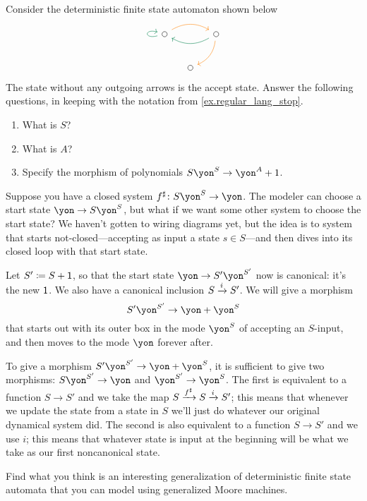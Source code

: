 \documentclass[DynamicalBook]{subfiles}
\begin{document}
\begin{exercise}
Consider the deterministic finite state automaton shown below
\[
\begin{tikzcd}[column sep=small]
	\LMO{}\ar[rr, bend left, orange]\ar[loop left, dgreen]&&
	\LMO{}\ar[dl, bend left, orange]\ar[ll, dgreen, bend left]\\&
	\LMO{}
\end{tikzcd}
\]
The state without any outgoing arrows is the accept state. Answer the following questions, in keeping with the notation from \cref{ex.regular_lang_stop}.

\begin{enumerate}
	\item What is $S$?
	\item What is $A$?
	\item Specify the morphism of polynomials $S\yon^S\to\yon^A+1$.
\qedhere
\end{enumerate}
\end{exercise}

\begin{example}
Suppose you have a closed system $f^\sharp\colon S\yon^S\to\yon$. The modeler can choose a start state $\yon\to S\yon^S$, but what if we want some other system to choose the start state? We haven't gotten to wiring diagrams yet, but the idea is to system that starts not-closed---accepting as input a state $s\in S$---and then dives into its closed loop with that start state.

Let $S'\coloneqq S+\textsf{1}$, so that the start state $\yon\to S'\yon^{S'}$ now is canonical: it's the new $\textsf{1}$. We also have a canonical inclusion $S\xrightarrow{i}S'$. We will give a morphism
\[
S'\yon^{S'}\to\yon+\yon^S
\]
that starts out with its outer box in the mode $\yon^S$ of accepting an $S$-input, and then moves to the mode $\yon$ forever after.

To give a morphism $S'\yon^{S'}\to\yon+\yon^S$, it is sufficient to give two morphisms: $S\yon^{S'}\to\yon$ and $\yon^{S'}\to\yon^S$. The first is equivalent to a function $S\to S'$ and we take the map $S\xrightarrow{f^\sharp}S\xrightarrow{i}S'$; this means that whenever we update the state from a state in $S$ we'll just do whatever our original dynamical system did. The second is also equivalent to a function $S\to S'$ and we use $i$; this means that whatever state is input at the beginning will be what we take as our first noncanonical state.
\end{example}

\begin{exercise}
Find what you think is an interesting generalization of deterministic finite state automata that you can model using generalized Moore machines.
\end{exercise}
\end{document}
